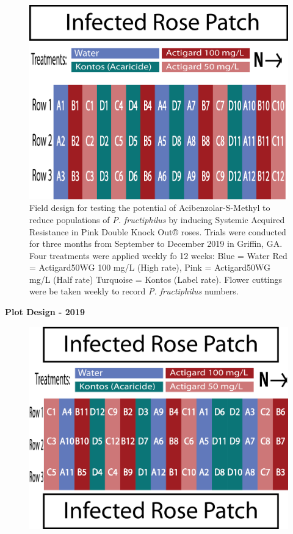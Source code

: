 \documentclass[12pt,final,CPage]{ufthesis}
\begin{document}
{\begin{figure}
  {\centering \includegraphics[width=0.8\linewidth]{figure/rrv_asm_plot_2018_griffin} 

  }

  \caption{Field design for testing the potential of Acibenzolar-S-Methyl to reduce populations of \textit{P. fructiphilus} by inducing Systemic Acquired Resistance in Pink Double Knock Out® roses. Trials were conducted for three months from September to December 2019 in Griffin, GA. Four treatments were applied weekly fo 12 weeks: Blue = Water Red = Actigard50WG 100 \si{\milli\gram}/L (High rate),  Pink = Actigard50WG \si{\milli\gram}/L (Half rate) Turquoise = Kontos (Label rate). Flower cuttings were be taken weekly to record \textit{P. fructiphilus} numbers.}\label{fig:unnamed-chunk-1}
  \end{figure}
  \textbf{Plot Design - 2019}
  \begin{figure}

  {\centering \includegraphics[width=0.8\linewidth]{figure/rrv_asm_plot_2019_griffin} 

}
\end{figure}}
\end{document}
